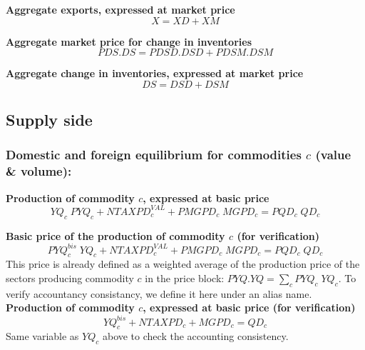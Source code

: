 \documentclass[12pt]{article}
\numberwithin{equation}{section}
\begin{document}
\noindent\textbf{Aggregate exports, expressed at market price} \\
\begin{dmath}
X = XD + XM
\end{dmath}

\noindent\textbf{Aggregate market price for change in inventories} \\
\begin{dmath}
PDS . DS = PDSD . DSD + PDSM . DSM
\end{dmath}

\noindent\textbf{Aggregate change in inventories, expressed at market price} \\
\begin{dmath}
DS = DSD + DSM
\end{dmath}

\newpage


\subsection{Supply side}





\subsubsection{Domestic and foreign equilibrium for commodities $c$ (value \& volume):}




\noindent\textbf{Production of commodity $c$, expressed at basic price} \\

\begin{dmath}
YQ_{c} \; PYQ_{c} + NTAXPD^{VAL}_{c} + PMGPD_{c} \; MGPD_{c} = PQD_{c} \; QD_{c}
\end{dmath}

\noindent\textbf{Basic price of the production of commodity $c$ (for verification)} \\
\begin{dmath}
PYQ^{bis}_{c} \; YQ_{c} + NTAXPD^{VAL}_{c} + PMGPD_{c} \; MGPD_{c} = PQD_{c} \; QD_{c}
\end{dmath}
 This price is already defined as a weighted average of the production price of the sectors producing commodity $c$ in the price block: $PYQ . YQ = \sum_{c} PYQ_{c} \; YQ_{c}$. To verify accountancy consistancy, we define it here under an alias name. \\

\noindent\textbf{Production of commodity $c$, expressed at basic price (for verification)} \\
\begin{dmath}
YQ^{bis}_{c} + NTAXPD_{c} + MGPD_{c} = QD_{c}
\end{dmath}
Same variable as $YQ_{c}$ above to check the accounting consistency. \\
\end{document}
